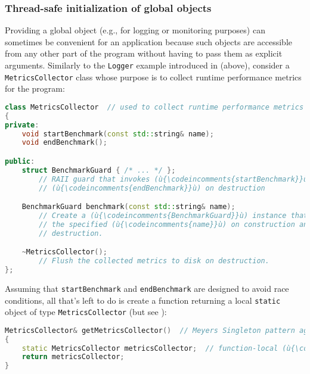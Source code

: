\subsubsection[Thread-safe initialization of global objects]{Thread-safe initialization of global objects}\label{thread-safe-initialization-of-global-objects}

Providing a global object (e.g., for logging or monitoring purposes) can
sometimes be convenient for an application because such objects are
accessible from any other part of the program without having to pass
them as explicit arguments. Similarly to the \lstinline!Logger! example
introduced in {} (above), consider a
\lstinline!MetricsCollector! class whose purpose is to collect runtime
performance metrics for the program:

\begin{lstlisting}[language=C++]
class MetricsCollector  // used to collect runtime performance metrics
{
private:
    void startBenchmark(const std::string& name);
    void endBenchmark();

public:
    struct BenchmarkGuard { /* ... */ };
        // RAII guard that invokes (ù{\codeincomments{startBenchmark}}ù) on construction and
        // (ù{\codeincomments{endBenchmark}}ù) on destruction

    BenchmarkGuard benchmark(const std::string& name);
        // Create a (ù{\codeincomments{BenchmarkGuard}}ù) instance that will start a benchmark for
        // the specified (ù{\codeincomments{name}}ù) on construction and end the benchmark on
        // destruction.

    ~MetricsCollector();
        // Flush the collected metrics to disk on destruction.
};
\end{lstlisting}
    
\noindent Assuming that \lstinline!startBenchmark! and \lstinline!endBenchmark! are
designed to avoid race conditions, all that's left to do is create a
function returning a local \lstinline!static! object of type
\lstinline!MetricsCollector! (but see ):

\begin{lstlisting}[language=C++]
MetricsCollector& getMetricsCollector()  // Meyers Singleton pattern again
{
    static MetricsCollector metricsCollector;  // function-local (ù{\codeincomments{static}}ù) object
    return metricsCollector;
}
\end{lstlisting}
    
